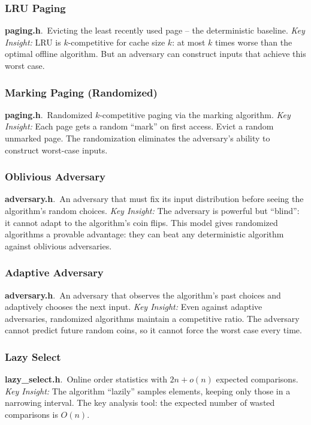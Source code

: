 \documentclass[11pt,a4paper]{article}
\newcommand{\algo}[2]{\textbf{#1}.\ #2}
\newcommand{\insight}{\textit{Key Insight: }}
\begin{document}
\subsubsection{LRU Paging}
\algo{paging.h}{Evicting the least recently used page -- the deterministic baseline.}
\insight LRU is \(k\)-competitive for cache size \(k\): at most \(k\) times worse than the optimal offline algorithm. But an adversary can construct inputs that achieve this worst case.

\subsubsection{Marking Paging (Randomized)}
\algo{paging.h}{Randomized \(k\)-competitive paging via the marking algorithm.}
\insight Each page gets a random ``mark'' on first access. Evict a random unmarked page. The randomization eliminates the adversary's ability to construct worst-case inputs.

\subsubsection{Oblivious Adversary}
\algo{adversary.h}{An adversary that must fix its input distribution before seeing the algorithm's random choices.}
\insight The adversary is powerful but ``blind'': it cannot adapt to the algorithm's coin flips. This model gives randomized algorithms a provable advantage: they can beat any deterministic algorithm against oblivious adversaries.

\subsubsection{Adaptive Adversary}
\algo{adversary.h}{An adversary that observes the algorithm's past choices and adaptively chooses the next input.}
\insight Even against adaptive adversaries, randomized algorithms maintain a competitive ratio. The adversary cannot predict future random coins, so it cannot force the worst case every time.

\subsubsection{Lazy Select}
\algo{lazy\_select.h}{Online order statistics with \(2n + o(n)\) expected comparisons.}
\insight The algorithm ``lazily'' samples elements, keeping only those in a narrowing interval. The key analysis tool: the expected number of wasted comparisons is \(O(n)\).
\end{document}
